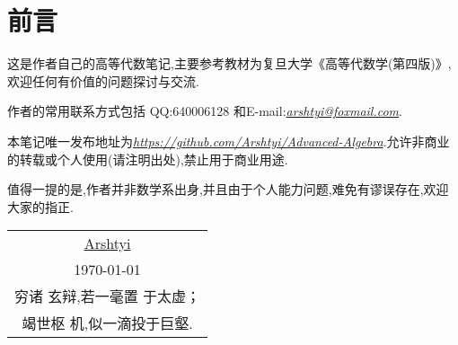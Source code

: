 \newpage
\section*{前言}
\thispagestyle{empty}
这是作者自己的高等代数笔记,主要参考教材为复旦大学《高等代数学(第四版)》,欢迎任何有价值的问题探讨与交流.

作者的常用联系方式包括 QQ:640006128 和E-mail:\textit{\url{arshtyi@foxmail.com}}.

本笔记唯一发布地址为\textit{\url{https://github.com/Arshtyi/Advanced-Algebra}}.允许非商业的转载或个人使用(请注明出处),禁止用于商业用途.

值得一提的是,作者并非数学系出身,并且由于个人能力问题,难免有谬误存在,欢迎大家的指正.
\begin{flushright}
    \begin{tabular}{c}
        \href{https://github.com/Arshtyi}{Arshtyi} \\
        \today                                     \\ 穷诸
        玄辩,若一毫置
        于太虚；                                       \\ 竭世枢
        机,似一滴投于巨壑.
    \end{tabular}
\end{flushright}
\thispagestyle{empty}
